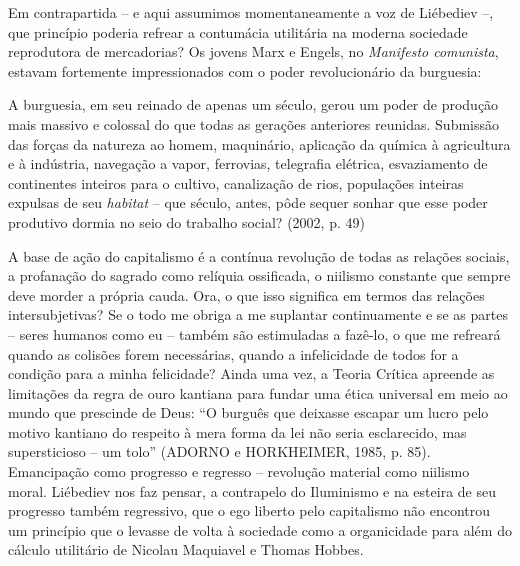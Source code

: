 Em contrapartida -- e aqui assumimos momentaneamente a voz de Liébediev
--, que princípio poderia refrear a contumácia utilitária na moderna
sociedade reprodutora de mercadorias? Os jovens Marx e Engels, no
\emph{Manifesto comunista}, estavam fortemente impressionados com o
poder revolucionário da burguesia:

A burguesia, em seu reinado de apenas um século, gerou um poder de
produção mais massivo e colossal do que todas as gerações anteriores
reunidas. Submissão das forças da natureza ao homem, maquinário,
aplicação da química à agricultura e à indústria, navegação a vapor,
ferrovias, telegrafia elétrica, esvaziamento de continentes inteiros
para o cultivo, canalização de rios, populações inteiras expulsas de seu
\emph{habitat} -- que século, antes, pôde sequer sonhar que esse poder
produtivo dormia no seio do trabalho social? (2002, p. 49)

A base de ação do capitalismo é a contínua revolução de todas as
relações sociais, a profanação do sagrado como relíquia ossificada, o
niilismo constante que sempre deve morder a própria cauda. Ora, o que
isso significa em termos das relações intersubjetivas? Se o todo me
obriga a me suplantar continuamente e se as partes -- seres humanos como
eu -- também são estimuladas a fazê-lo, o que me refreará quando as
colisões forem necessárias, quando a infelicidade de todos for a
condição para a minha felicidade? Ainda uma vez, a Teoria Crítica
apreende as limitações da regra de ouro kantiana para fundar uma ética
universal em meio ao mundo que prescinde de Deus: ``O burguês que
deixasse escapar um lucro pelo motivo kantiano do respeito à mera forma
da lei não seria esclarecido, mas supersticioso -- um tolo'' (ADORNO e
HORKHEIMER, 1985, p. 85). Emancipação como progresso e regresso --
revolução material como niilismo moral. Liébediev nos faz pensar, a
contrapelo do Iluminismo e na esteira de seu progresso também
regressivo, que o ego liberto pelo capitalismo não encontrou um
princípio que o levasse de volta à sociedade como a organicidade para
além do cálculo utilitário de Nicolau Maquiavel e Thomas Hobbes.

